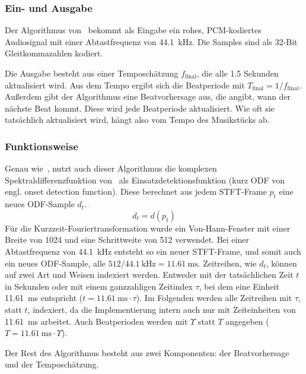{{		\subsubsection*{Ein- und Ausgabe}
		{
			Der Algorithmus von~\cite{2009_DaPlSt} bekommt als Eingabe ein rohes, PCM-kodiertes Audiosignal mit einer Abtastfrequenz von \SI{44.1}{\kilo\hertz}.
			Die Samples sind als 32-Bit Gleitkommazahlen kodiert.

			Die Ausgabe besteht aus einer Temposchätzung $f_\text{final}$,
				die alle \num{1.5} Sekunden aktualisiert wird.
			Aus dem Tempo ergibt sich die Beatperiode mit $T_\text{final} = 1 / f_\text{final}$.
			Außerdem gibt der Algorithmus eine Beatvorhersage aus,
				die angibt,
				wann der nächste Beat kommt.
			Diese wird jede Beatperiode aktualisiert.
			Wie oft sie tatsächlich aktualisiert wird,
				hängt also vom Tempo des Musikstücks ab.
		}

		\subsubsection*{Funktionsweise}
		{
			Genau wie~\cite{2011_PlRoSt},
				nutzt auch dieser Algorithmus die komplexen Spektraldifferenzfunktion von~\cite{2004_BeDaDuSa}
				als Einsatzdetektionsfunktion (kurz ODF von engl. onset detection function).
			Diese berechnet aus jedem STFT-Frame $p_t$ eine neues ODF-Sample $d_t$.
			\begin{equation}
				d_t = d(p_t)
			\end{equation}
			Für die Kurzzeit-Fouriertransformation wurde ein Von-Hann-Fenster mit einer Breite von \num{1024} und eine Schrittweite von \num{512} verwendet.
			Bei einer Abtastfrequenz von \SI{44.1}{\kilo\hertz} entsteht so ein neuer STFT-Frame,
				und somit auch ein neues ODF-Sample,
				alle $512 / \SI{44.1}{\kilo\hertz} = \SI{11.61}{\milli\second}$.
			Zeitreihen, wie $d_t$, können auf zwei Art und Weisen indexiert werden.
			Entweder mit der tatsächlichen Zeit $t$ in Sekunden
				oder mit einem ganzzahligen Zeitindex $\tau$,
				bei dem eine Einheit \SI{11.61}{\milli\second} entspricht
				($t = \SI{11.61}{\milli\second} \cdot \tau$).
			Im Folgenden werden alle Zeitreihen mit $\tau$, statt $t$, indexiert,
				da die Implementierung intern auch nur mit Zeiteinheiten von \SI{11.61}{\milli\second} arbeitet.
			Auch Beatperioden werden mit $\Upsilon$ statt $T$ angegeben ($T = \SI{11.61}{\milli\second} \cdot \Upsilon$).


			Der Rest des Algorithmus besteht aus zwei Komponenten:
				der Beatvorhersage und der Temposchätzung.

}}}
